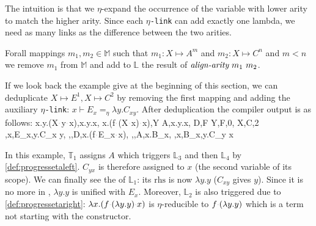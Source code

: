 \documentclass[sigconf,natbib=false,review]{acmart}
\newcommand{\appsep}{\ensuremath{\textcolor{lightgray}{\cdot}}}
\newcommand{\linkMacro}[1]{\ensuremath{#1}\texttt{-link}\xspace}
\newcommand{\linketa} {\linkMacro{\eta}}
\newcommand{\Fo}{\ensuremath{\mathcal{F}_{\!o}\xspace}} %
\newcommand{\Ho}{\ensuremath{\mathcal{H}_o}\xspace}
\newcommand{\linketaM}[3]{\ensuremath{#1 \vdash #2 =_\eta #3}}
\newcommand{\mapping}[3]{\ensuremath{#1 \mapsto #2^#3}}
\newcommand{\lhs}{\ensuremath{\mathrm{lhs}}\xspace}
\newcommand{\rhs}{\ensuremath{\mathrm{rhs}}\xspace}
\newcommand{\linkStore}{\ensuremath{\mathbb{L}}\xspace}
\newcommand{\mapStore}{\ensuremath{\mathbb{M}}\xspace}
\newcommand{\hoUnifPb}{\ensuremath{\mathbb{T}}\xspace}
\begin{document}
The intuition is that we $\eta$-expand the occurrence of the variable
with lower arity to match the higher arity. Since each \linketa can
add exactly one lambda, we need as many links as the difference between the
two arities.

\newcommand{\mapdeduplication}{\emph{map-deduplication}}

\begin{definition}[\mapdeduplication]
  Forall mappings $m_1, m_2\in \mapStore$ such that 
  $m_1 : X \mapsto A^m$ and
  $m_2 : X \mapsto C^n$ and $m < n$
  we remove $m_1$ from \mapStore and
  add to \linkStore the result of $\emph{align-arity}{}~m_1~m_2$.
\end{definition}

If we look back the example give at the beginning of this section, we can
deduplicate $\mapping{X}{E}{1}, \mapping{X}{C}{2}$ by removing the first mapping
and adding the auxiliary \linketa: \linketaM{x}{E_{x}}{\lambda y.C_{x y}}.
After deduplication the compiler output is as follows:
\printAlll
  {{{\lambda x.\lambda y.(X\appsep y\appsep x),\lambda x.\lambda y.x},
    {\lambda x.(f\appsep (X\appsep x)\appsep x),Y}}}
  {{{A,\lambda x.\lambda y.x},
    {D,F}}}
  {{{Y,F,0},
    {X,C,2}}}
  {{{\eta,x,E_{x},\lambda y.C_{x y}},
    {\eta,,D,\lambda x.(f\appsep E_{x}\appsep x)},
    {\eta,,A,\lambda x.B_{x}},
    {\eta,x,B_{x},\lambda y.C_{y x}}}}

In this example, $\hoUnifPb_1$ assigns $A$ which triggers $\linkStore_3$ and
then $\linkStore_4$ by \cref{def:progressetaleft}. $C_{yx}$ is therefore
assigned to $x$ (the second variable of its scope). We can finally see the
\progressetaright of $\linkStore_1$: its \rhs is now $\lambda y.y$ ($C_{xy}$
gives $y$). Since it is no more in \maybeeta, $\lambda y.y$ is unified with
$E_x$. Moreover, $\linkStore_2$ is also triggered due to
\cref{def:progressetaright}: $\lambda x.(f \appsep (\lambda y.y) \appsep x)$ is
$\eta$-reducible to $f \appsep (\lambda y.y)$ which is a term not starting with
the  constructor.

\end{document}
